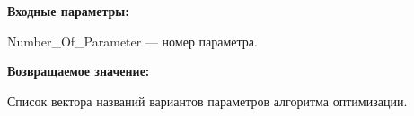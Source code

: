 \textbf{Входные параметры:}

Number\_Of\_Parameter --- номер параметра.

\textbf{Возвращаемое значение:}

Список вектора названий вариантов параметров алгоритма оптимизации.